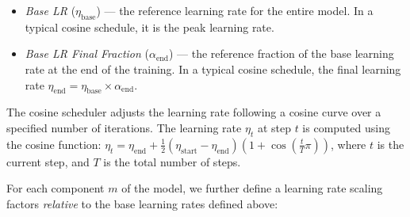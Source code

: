 \documentclass{article}
\theoremstyle{plain}
\theoremstyle{definition}
\theoremstyle{remark}
\newcommand{\jl}[1]{\textcolor{green}{[JL: #1]}}
\newcommand{\jmr}[2]{\textcolor{purple}{[JM:] \sout{#1} #2}}
\begin{document}
    \begin{itemize}[topsep=0pt, leftmargin=*] 
    \item \textit{Base LR} ($\eta_{\text{base}}$) --- the reference learning rate for the entire model. In a typical cosine schedule, it is the peak learning rate.
    
    \item \textit{Base LR Final Fraction} ($\alpha_{\text{end}}$) --- the reference fraction of the base learning rate at the end of the training. In a typical cosine schedule, the final learning rate $\eta_{\text{end}} = \eta_{\text{base}} \times \alpha_{\text{end}}$. %
    
    
     \end{itemize}
    
    
    The cosine scheduler adjusts the learning rate following a cosine curve over a specified number of iterations.  The learning rate $\eta_t$ at step $t$ is computed using the cosine function: $\eta_t = \eta_{\text{end}} + \frac{1}{2} (\eta_{\text{start}} - \eta_{\text{end}}) \left(1 + \cos\left(\frac{t}{T} \pi\right)\right)$, where $t$ is the current step, and $T$ is the total number of steps.
    
    
    For each component $m$ of the model, we further define a learning rate scaling factors \textit{relative} to the base learning rates defined above:
    
\end{document}
